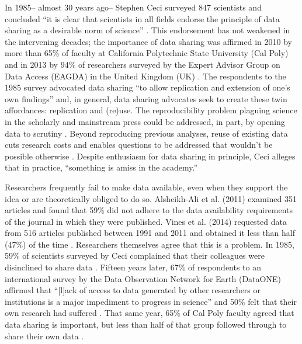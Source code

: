 \documentclass[10pt]{article}
\begin{document}
In 1985-- almost 30 years ago-- Stephen Ceci surveyed 847 scientists and concluded ``it is clear that scientists in all fields endorse the principle of data sharing as a desirable norm of science'' \cite{ceci_scientists_1988}.
This endorsement has not weakened in the intervening decades; the importance of data sharing was affirmed in 2010 by more than 65\% of faculty at California Polytechnic State University (Cal Poly) \cite{scaramozzino_study_2012} and in 2013 by 94\% of researchers surveyed by the Expert Advisor Group on Data Access (EAGDA) in the United Kingdom (UK) \cite{bobrow_establishing_2014}.
The respondents to the 1985 survey advocated data sharing ``to allow replication and extension of one's own findings'' \cite{ceci_scientists_1988} and, in general, data sharing advocates seek to create these twin affordances: replication and (re)use.
The reproducibility problem plaguing science in the scholarly \cite{ioannidis_why_2005, prinz_believe_2011, mobley_survey_2013} and mainstream \cite{zimmer_rise_2012, _how_2013, editors_trouble_2013} press could be addressed, in part, by opening data to scrutiny \cite{drew_lost_2013, collins_nih_2014}.
Beyond reproducing previous analyses, reuse of existing data cuts research costs \cite{piwowar_data_2011} and enables questions to be addressed that wouldn't be possible otherwise \cite{stewart_meta-analysis_2010, borenstein_introduction_2011}.
Despite enthusiasm for data sharing in principle, Ceci alleges that in practice, ``something is amiss in the academy.''

Researchers frequently fail to make data available, even when they support the idea or are theoretically obliged to do so.
Alsheikh-Ali et al. (2011) examined 351 articles and found that 59\% did not adhere to the data availability requirements of the journal in which they were published.
Vines et al. (2014) requested data from 516 articles published between 1991 and 2011 and obtained it less than half (47\%) of the time \cite{vines_availability_2014}.
Researchers themselves agree that this is a problem.
In 1985, 59\% of scientists surveyed by Ceci complained that their colleagues were disinclined to share data \cite{ceci_scientists_1988}.
Fifteen years later, 67\% of respondents to an international survey by the Data Observation Network for Earth (DataONE) affirmed that ``[l]ack of access to data generated by other researchers or institutions is a major impediment to progress in science'' and 50\% felt that their own research had suffered \cite{tenopir_data_2011}.
That same year, 65\% of Cal Poly faculty agreed that data sharing is important, but less than half of that group followed through to share their own data \cite{scaramozzino_study_2012}.
\end{document}
